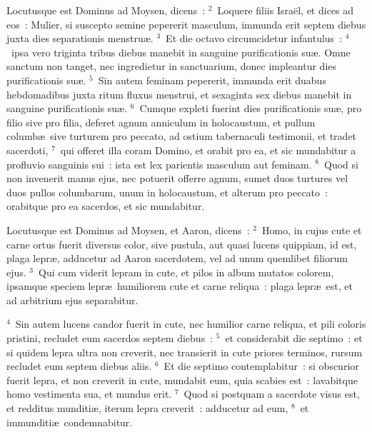 \lettrine[lines=3,image=true,loversize=0.05,lraise=-0.03]{L}{}ocutusque est Dominus ad Moysen, dicens~:
${}^{2}$~Loquere filiis Isra\"el, et dices ad eos~: Mulier, si suscepto semine pepererit masculum, immunda erit septem diebus juxta dies separationis menstru\ae .
${}^{3}$~Et die octavo circumcidetur infantulus~:
${}^{4}$~ipsa vero triginta tribus diebus manebit in sanguine purificationis su\ae . Omne sanctum non tanget, nec ingredietur in sanctuarium, donec impleantur dies purificationis su\ae .
${}^{5}$~Sin autem feminam pepererit, immunda erit duabus hebdomadibus juxta ritum fluxus menstrui, et sexaginta sex diebus manebit in sanguine purificationis su\ae .
${}^{6}$~Cumque expleti fuerint dies purificationis su\ae , pro filio sive pro filia, deferet agnum anniculum in holocaustum, et pullum columb\ae\ sive turturem pro peccato, ad ostium tabernaculi testimonii, et tradet sacerdoti,
${}^{7}$~qui offeret illa coram Domino, et orabit pro ea, et sic mundabitur a profluvio sanguinis sui~: ista est lex parientis masculum aut feminam.
${}^{8}$~Quod si non invenerit manus ejus, nec potuerit offerre agnum, sumet duos turtures vel duos pullos columbarum, unum in holocaustum, et alterum pro peccato~: orabitque pro ea sacerdos, et sic mundabitur.

\lettrine[lines=3,image=true,loversize=0.05,lraise=-0.03]{L}{}ocutusque est Dominus ad Moysen, et Aaron, dicens~:
${}^{2}$~Homo, in cujus cute et carne ortus fuerit diversus color, sive pustula, aut quasi lucens quippiam, id est, plaga lepr\ae , adducetur ad Aaron sacerdotem, vel ad unum quemlibet filiorum ejus.
${}^{3}$~Qui cum viderit lepram in cute, et pilos in album mutatos colorem, ipsamque speciem lepr\ae\ humiliorem cute et carne reliqua~: plaga lepr\ae\ est, et ad arbitrium ejus separabitur.


${}^{4}$~Sin autem lucens candor fuerit in cute, nec humilior carne reliqua, et pili coloris pristini, recludet eum sacerdos septem diebus~:
${}^{5}$~et considerabit die septimo~: et si quidem lepra ultra non creverit, nec transierit in cute priores terminos, rursum recludet eum septem diebus aliis.
${}^{6}$~Et die septimo contemplabitur~: si obscurior fuerit lepra, et non creverit in cute, mundabit eum, quia scabies est~: lavabitque homo vestimenta sua, et mundus erit.
${}^{7}$~Quod si postquam a sacerdote visus est, et redditus munditi\ae , iterum lepra creverit~: adducetur ad eum,
${}^{8}$~et immunditi\ae\ condemnabitur.


